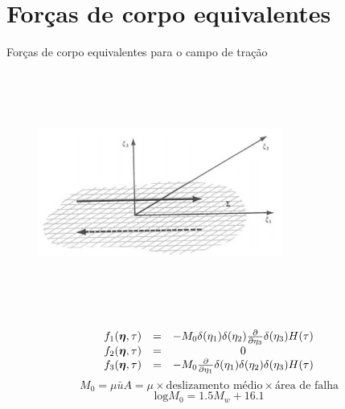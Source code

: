 \documentclass{beamer}
\begin{document}
\section{Forças de corpo equivalentes}


\begin{frame}{Forças de corpo equivalentes para o campo de tração}

\end{frame}

\begin{frame}
	\begin{figure}[htb]
		\centering
		\includegraphics[width= 8cm, height= 8cm]{superficie}
	\end{figure}
\end{frame}

\begin{frame}
	\begin{equation}
	\begin{matrix}
	f_1(\boldsymbol{\eta},\tau) &=& -M_0\delta(\eta_1)\delta(\eta_2)\frac{\partial}{\partial \eta_3}\delta(\eta_3)H(\tau) \nonumber \\
	f_2(\boldsymbol{\eta},\tau)& =& 0 \nonumber \\
	f_3(\boldsymbol{\eta},\tau) &=& -M_0\frac{\partial}{\partial \eta_1}\delta(\eta_1)\delta(\eta_2)\delta(\eta_3)H(\tau)
	\end{matrix}
	\end{equation}
	$$M_0 =  \mu \bar{u}A = \mu \times \text{deslizamento médio} \times \text{área de falha} $$
	$$\text{log} M_0 = 1.5 M_w + 16.1 $$
\end{frame}
\end{document}
